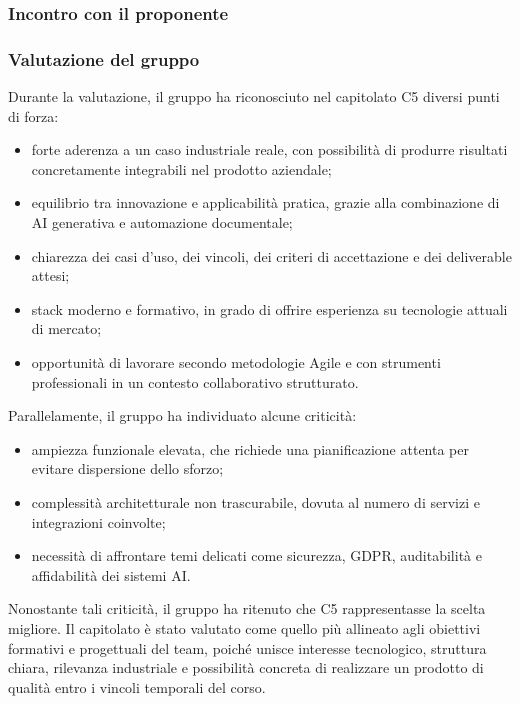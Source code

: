 \documentclass[a4paper,12pt]{article}
\begin{document}
\subsubsection{Incontro con il proponente}

\subsubsection{Valutazione del gruppo}

Durante la valutazione, il gruppo ha riconosciuto nel capitolato C5 diversi punti di forza:

\begin{itemize}
    \item forte aderenza a un caso industriale reale, con possibilità di produrre risultati concretamente integrabili nel prodotto aziendale;
    \item equilibrio tra innovazione e applicabilità pratica, grazie alla combinazione di AI generativa e automazione documentale;
    \item chiarezza dei casi d'uso, dei vincoli, dei criteri di accettazione e dei deliverable attesi;
    \item stack moderno e formativo, in grado di offrire esperienza su tecnologie attuali di mercato;
    \item opportunità di lavorare secondo metodologie Agile e con strumenti professionali in un contesto collaborativo strutturato.
\end{itemize}

Parallelamente, il gruppo ha individuato alcune criticità:

\begin{itemize}
    \item ampiezza funzionale elevata, che richiede una pianificazione attenta per evitare dispersione dello sforzo;
    \item complessità architetturale non trascurabile, dovuta al numero di servizi e integrazioni coinvolte;
    \item necessità di affrontare temi delicati come sicurezza, GDPR, auditabilità e affidabilità dei sistemi AI.
\end{itemize}

Nonostante tali criticità, il gruppo ha ritenuto che C5 rappresentasse la scelta migliore. Il capitolato è stato valutato come quello più allineato agli obiettivi formativi e progettuali del team, poiché unisce interesse tecnologico, struttura chiara, rilevanza industriale e possibilità concreta di realizzare un prodotto di qualità entro i vincoli temporali del corso.
\end{document}
